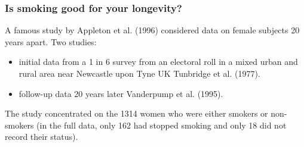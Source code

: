 \documentclass[a4paper]{article}
\begin{document}
\subsubsection{Is smoking good for your longevity?}
A famous study by Appleton et al. (1996) considered data on female subjects 20 years apart. Two studies:
\begin{itemize}
	\item initial data from a 1 in 6 survey from an electoral roll in a mixed urban and rural area near Newcastle upon Tyne UK Tunbridge et al. (1977).
	\item follow-up data 20 years later Vanderpump et al. (1995).
\end{itemize}
The study concentrated on the 1314 women who were either smokers or non- smokers (in the full data, only 162 had stopped smoking and only 18 did not record their status).
\end{document}
